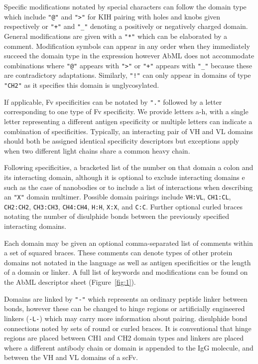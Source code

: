 \documentclass{article}
\begin{document}
Specific modifications notated by special characters can follow the
domain type which include \verb|"@"| and \verb|">"| for KIH pairing
with holes and knobs given respectively or \verb|"+"| and \verb|"_"|
denoting a positively or negatively charged domain. General
modifications are given with a \verb|"*"| which can be elaborated by a
comment. Modification symbols can appear in any order when they
immediately succeed the domain type in the expression however AbML
does not accommodate combinations where \verb|"@"| appears with
\verb|">"| or \verb|"+"| appears with \verb|"_"| because these are
contradictory adaptations. Similarly, \verb|"!"| can only appear in
domains of type \verb|"CH2"| as it specifies this domain is
unglycosylated.

If applicable, Fv specificities can be notated by \verb|"."| followed by a
letter corresponding to one type of Fv specificity. We provide letters
a-h, with a single letter representing a different antigen specificity
or multiple letters can indicate a combination of
specificities. Typically, an interacting pair of VH and VL domains
should both be assigned identical specificity descriptors but
exceptions apply when two different light chains share a common heavy
chain. 

Following specificities, a bracketed list of the number on that domain
a colon and its interacting domain, although it is optional to exclude
interacting domains e such as the case of nanobodies or to include a
list of interactions when describing an \verb|"X"| domain
multimer. Possible domain pairings include \verb|VH:VL|,
\verb|CH1:CL|, \verb|CH2:CH2|, \verb|CH3:CH3|, \verb|CH4:CH4|,
\verb|H:H|, \verb|X:X|, and \verb|C:C|. Further optional curled braces
notating the number of disulphide bonds between the previously
specified interacting domains.

Each domain may be given an optional comma-separated list of comments
within a set of  squared braces. These comments can denote types of
other protein domains not notated in the language as well as antigen
specificities or the length of a domain or linker. A full list of
keywords and modifications can be found on the AbML descriptor sheet
(Figure~\ref{fig:1}).

Domains are linked by \verb|"-"| which represents an ordinary peptide linker
between bonds, however these can be changed to hinge regions or
artificially engineered linkers (\verb|-L-|) which may carry more information
about pairing. disulphide bond connections noted by sets of round or
curled braces. It is conventional that hinge regions are placed
between CH1 and CH2 domain types and linkers are placed where a
different antibody chain or domain is appended to the IgG molecule,
and between the VH and VL domains of a scFv.  
\end{document}
